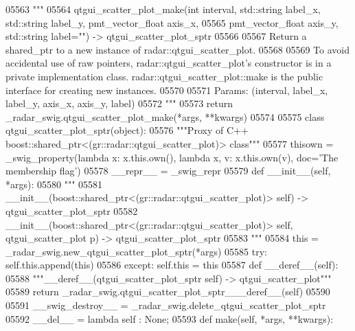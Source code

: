 \begin{DoxyCode}
{{{{{{{{{{{{{{{{{{{05563   \textcolor{stringliteral}{"""}
05564 \textcolor{stringliteral}{    qtgui\_scatter\_plot\_make(int interval, std::string label\_x, std::string label\_y, pmt\_vector\_float
       axis\_x, }
05565 \textcolor{stringliteral}{        pmt\_vector\_float axis\_y, std::string label="") -> qtgui\_scatter\_plot\_sptr}
05566 \textcolor{stringliteral}{}
05567 \textcolor{stringliteral}{    Return a shared\_ptr to a new instance of radar::qtgui\_scatter\_plot.}
05568 \textcolor{stringliteral}{}
05569 \textcolor{stringliteral}{    To avoid accidental use of raw pointers, radar::qtgui\_scatter\_plot's constructor is in a private
       implementation class. radar::qtgui\_scatter\_plot::make is the public interface for creating new instances.}
05570 \textcolor{stringliteral}{}
05571 \textcolor{stringliteral}{    Params: (interval, label\_x, label\_y, axis\_x, axis\_y, label)}
05572 \textcolor{stringliteral}{    """}
05573   \textcolor{keywordflow}{return} \_radar\_swig.qtgui\_scatter\_plot\_make(*args, **kwargs)
05574 
05575 \textcolor{keyword}{class }qtgui_scatter_plot_sptr(object):
05576     \textcolor{stringliteral}{"""Proxy of C++ boost::shared\_ptr<(gr::radar::qtgui\_scatter\_plot)> class"""}
05577     thisown = _swig_property(\textcolor{keyword}{lambda} x: x.this.own(), \textcolor{keyword}{lambda} x, v: x.this.own(v), doc=\textcolor{stringliteral}{'The membership flag'})
05578     \_\_repr\_\_ = \_swig\_repr
05579     \textcolor{keyword}{def }__init__(self, *args): 
05580         \textcolor{stringliteral}{"""}
05581 \textcolor{stringliteral}{        \_\_init\_\_(boost::shared\_ptr<(gr::radar::qtgui\_scatter\_plot)> self) -> qtgui\_scatter\_plot\_sptr}
05582 \textcolor{stringliteral}{        \_\_init\_\_(boost::shared\_ptr<(gr::radar::qtgui\_scatter\_plot)> self, qtgui\_scatter\_plot p) ->
       qtgui\_scatter\_plot\_sptr}
05583 \textcolor{stringliteral}{        """}
05584         this = \_radar\_swig.new\_qtgui\_scatter\_plot\_sptr(*args)
05585         \textcolor{keywordflow}{try}: self.this.append(this)
05586         \textcolor{keywordflow}{except}: self.this = this
05587     \textcolor{keyword}{def }__deref__(self):
05588         \textcolor{stringliteral}{"""\_\_deref\_\_(qtgui\_scatter\_plot\_sptr self) -> qtgui\_scatter\_plot"""}
05589         \textcolor{keywordflow}{return} \_radar\_swig.qtgui\_scatter\_plot\_sptr\_\_\_deref\_\_(self)
05590 
05591     \_\_swig\_destroy\_\_ = \_radar\_swig.delete\_qtgui\_scatter\_plot\_sptr
05592     \_\_del\_\_ = \textcolor{keyword}{lambda} self : \textcolor{keywordtype}{None};
05593     \textcolor{keyword}{def }make(self, *args, **kwargs):
}}}}}}}}}}}}}}}}}}}
\end{DoxyCode}
